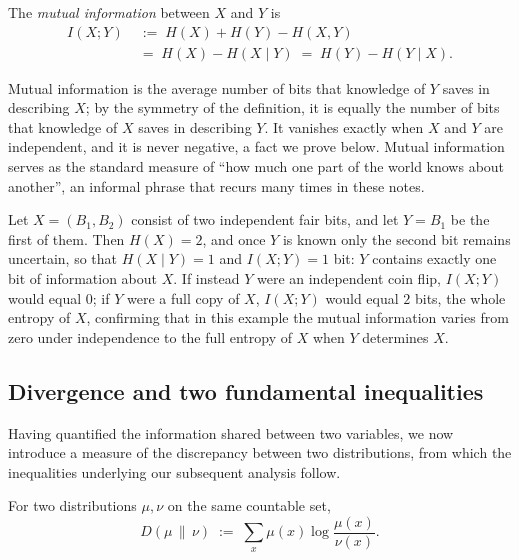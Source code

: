 \documentclass[11pt]{article}
\begin{document}
\begin{definition}
\label{def:mi}
The \emph{mutual information} between $X$ and $Y$ is
\begin{align*}
I(X;Y) \;&:=\; H(X) + H(Y) - H(X,Y)\\
\;&=\; H(X) - H(X \mid Y) \;=\; H(Y) - H(Y \mid X).
\end{align*}
\end{definition}

Mutual information is the average number of bits that knowledge of $Y$ saves in describing $X$; by the symmetry of the definition, it is equally the number of bits that knowledge of $X$ saves in describing $Y$. It vanishes exactly when $X$ and $Y$ are independent, and it is never negative, a fact we prove below. Mutual information serves as the standard measure of ``how much one part of the world knows about another'', an informal phrase that recurs many times in these notes.

\begin{example}
Let $X = (B_1, B_2)$ consist of two independent fair bits, and let $Y = B_1$ be the first of them. Then $H(X) = 2$, and once $Y$ is known only the second bit remains uncertain, so that $H(X \mid Y) = 1$ and $I(X;Y) = 1$ bit: $Y$ contains exactly one bit of information about $X$. If instead $Y$ were an independent coin flip, $I(X;Y)$ would equal $0$; if $Y$ were a full copy of $X$, $I(X;Y)$ would equal $2$ bits, the whole entropy of $X$, confirming that in this example the mutual information varies from zero under independence to the full entropy of $X$ when $Y$ determines $X$.
\end{example}

\subsection{Divergence and two fundamental inequalities}

Having quantified the information shared between two variables, we now introduce a measure of the discrepancy between two distributions, from which the inequalities underlying our subsequent analysis follow.

\begin{definition}
For two distributions $\mu, \nu$ on the same countable set,
\[
D(\mu \,\|\, \nu) \;:=\; \sum_x \mu(x) \log \frac{\mu(x)}{\nu(x)} .
\]
\end{definition}
\end{document}
